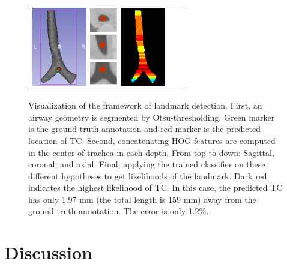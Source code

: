 \documentclass{llncs}
\begin{document}
\begin{figure}[tb]
  \begin{center}
    \begin{tabular}{ccc}
    \includegraphics[height=34.5mm] {fig/Fleck_005_geometry.png}
    \includegraphics[height=35mm] {fig/landmark.png}
    \includegraphics[height=34.5mm] {fig/Fleck_005_likelihood.png}
    \end{tabular}
    \caption{ \label{fig:detection} Visualization of the framework of landmark detection. First, an airway geometry is segmented by Otsu-thresholding. Green marker is the ground truth annotation and red marker is the predicted location of TC. Second, concatenating HOG features are computed in the center of trachea in each depth. From top to down: Sagittal, coronal, and axial. Final, applying the trained classifier on these different hypotheses to get likelihoods of the landmark. Dark red indicates the highest likelihood of TC. In this case, the predicted TC has only 1.97 mm (the total length is 159 mm) away from the ground truth annotation. The error is only 1.2$\%$.
    }
  \end{center}
\end{figure}

\section{Discussion}
\label{sec:discussion}



\end{document}
